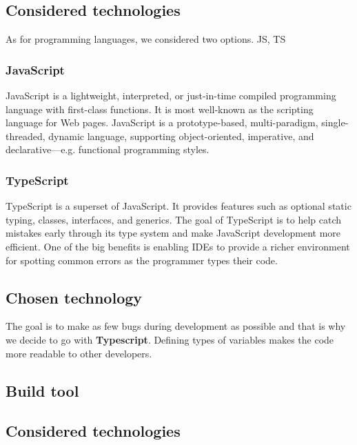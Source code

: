   \subsection*{Considered technologies}
  As for programming languages, we considered two options. 
  JS, TS

  \subsubsection*{JavaScript}
  JavaScript is a lightweight, interpreted, or just-in-time compiled programming language with first-class functions. 
  It is most well-known as the scripting language for Web pages. 
  JavaScript is a prototype-based, multi-paradigm, single-threaded, dynamic language, supporting object-oriented, imperative, and declarative---e.g. functional programming styles.

  \subsubsection*{TypeScript}
  TypeScript is a superset of JavaScript. 
  It provides features such as optional static typing, classes, interfaces, and generics. 
  The goal of TypeScript is to help catch mistakes early through its type system and make JavaScript development more efficient. 
  One of the big benefits is enabling IDEs to provide a richer environment for spotting common errors as the programmer types their code.

  \subsection*{Chosen technology}
  The goal is to make as few bugs during development as possible and that is why we decide to go with \textbf{Typescript}.
  Defining types of variables makes the code more readable to other developers.

\subsection{Build tool}

  \subsection*{Considered technologies}


